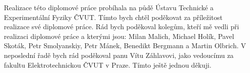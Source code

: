 Realizace této diplomové práce probíhala na půdě Ústavu Technické a Experimentální Fyziky ČVUT. Tímto bych chtěl poděkovat za příležitost realizace své diplomové práce. Rád bych poděkoval kolegům, kteří mě vedli při realizaci diplomové práce a kterými jsou: Milan Malich, Michael Holík, Pavel Skoták, Petr Smolyanskiy, Petr Mánek, Benedikt Bergmann a Martin Olbrich. V neposlední řadě bych rád poděkoval panu Vítu Záhlavovi, jako vedoucímu za fakultu Elektrotechnickou ČVUT v Praze. Tímto ještě jednou děkuji. 